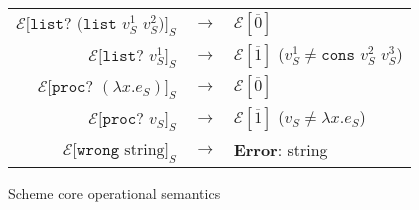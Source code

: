 \begin{figure}
\begin{center}
\begin{tabular}{rcl}
$\mathscr{E}[\mathtt{list?}$ $(\mathtt{list}$ $v_{S}^{1}$ $v_{S}^{2})]_{S}$ & $\rightarrow$ & $\mathscr{E}[\overline{0}]$ \\
$\mathscr{E}[\mathtt{list?}$ $v_{S}^{1}]_{S}$ & $\rightarrow$ & $\mathscr{E}[\overline{1}]$ ($v_{S}^{1}\neq\mathtt{cons}$ $v_{S}^{2}$ $v_{S}^{3}$) \\
$\mathscr{E}[\mathtt{proc?}$ $(\lambda x.e_{S})]_{S}$ & $\rightarrow$ & $\mathscr{E}[\overline{0}]$ \\
$\mathscr{E}[\mathtt{proc?}$ $v_{S}]_{S}$ & $\rightarrow$ & $\mathscr{E}[\overline{1}]$ ($v_{S}\neq\lambda x.e_{S}$) \\
$\mathscr{E}[\mathtt{wrong}$ $\mathrm{string}]_{S}$ & $\rightarrow$ & \textbf{Error}: string
\end{tabular}
\end{center}
\caption{Scheme core operational semantics}
\label{fig:scos}
\end{figure}